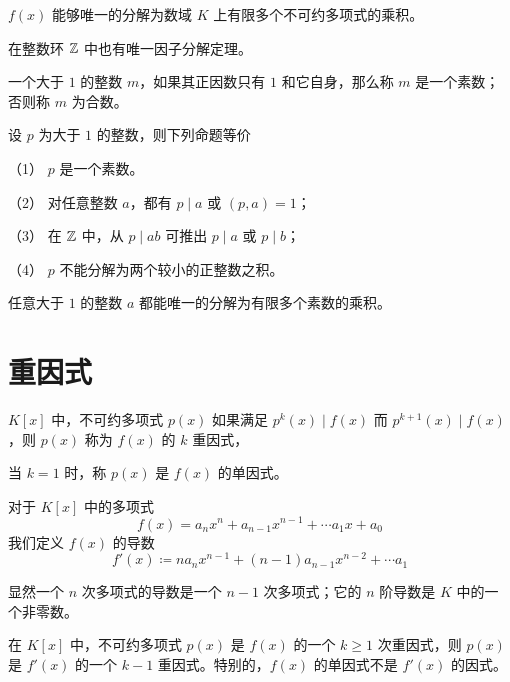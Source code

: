 \begin{theorem}
    $f(x)$ 能够唯一的分解为数域 $K$ 上有限多个不可约多项式的乘积。
\end{theorem}

在整数环 $\mathbb{Z}$ 中也有唯一因子分解定理。

\begin{definition}
    一个大于 $1$ 的整数 $m$，如果其正因数只有 $1$ 和它自身，那么称 $m$ 是一个素数；否则称 $m$ 为合数。
\end{definition}

\begin{theorem}
    设 $p$ 为大于 $1$ 的整数，则下列命题等价
    
    （1） $p$ 是一个素数。
    
    （2） 对任意整数 $a$，都有 $p \mid a$ 或 $(p,a) = 1$；
    
    （3） 在 $\mathbb{Z}$ 中，从 $p \mid ab$ 可推出 $p \mid a$ 或 $p \mid b$；
    
    （4） $p$ 不能分解为两个较小的正整数之积。
\end{theorem}

\begin{theorem}[算术基本定理]
    任意大于 $1$ 的整数 $a$ 都能唯一的分解为有限多个素数的乘积。
\end{theorem}

\section{重因式}

\begin{definition}
    $K[x]$ 中，不可约多项式 $p(x)$ 如果满足 $p^k(x) \mid f(x)$ 而 $p^{k+1}(x) \mid f(x)$，则 $p(x)$ 称为 $f(x)$ 的 $k$ 重因式，
\end{definition}

当 $k=1$ 时，称 $p(x)$ 是 $f(x)$ 的单因式。

\begin{definition}
    对于 $K[x]$ 中的多项式
    \[f(x) = a_nx^n + a_{n-1}x^{n-1} + \cdots a_1 x + a_0\]
    我们定义 $f(x)$ 的导数
    \[f'(x) \coloneqq  na_nx^{n-1} + (n-1)a_{n-1}x^{n-2} + \cdots a_1\]
\end{definition}

显然一个 $n$ 次多项式的导数是一个 $n-1$ 次多项式；它的 $n$ 阶导数是 $K$ 中的一个非零数。

\begin{theorem}
    在 $K[x]$ 中，不可约多项式 $p(x)$ 是 $f(x)$ 的一个 $k \geqslant 1$ 次重因式，则 $p(x)$ 是 $f'(x)$ 的一个 $k-1$ 重因式。特别的，$f(x)$ 的单因式不是 $f'(x)$ 的因式。
\end{theorem}

